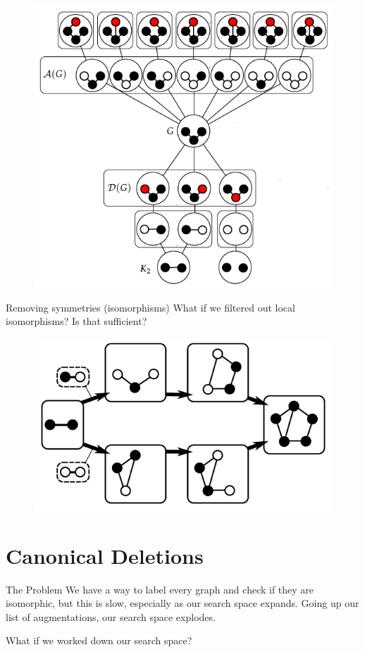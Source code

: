 \documentclass[aspectratio=169]{beamer}
\begin{document}
\begin{frame}{}
    \begin{figure}
        \centering
        \includegraphics[width = 0.7\linewidth]{aug_delete_k2.png}
    \end{figure}
\end{frame}

\begin{frame}{Removing symmetries (isomorphisms)}
    What if we filtered out local isomorphisms? Is that sufficient? \pause
    \begin{figure}
        \centering
        \includegraphics[width = 0.7\linewidth]{isomorph.png}
    \end{figure}
\end{frame}

\section{Canonical Deletions}
\frame{\sectionpage}

\begin{frame}{The Problem}
    We have a way to label every graph and check if they are isomorphic, but this is slow, especially as our search space expands. Going up our list of augmentations, our search space explodes. \pause 

    \hfill
    
    What if we worked down our search space?
\end{frame}
\end{document}
